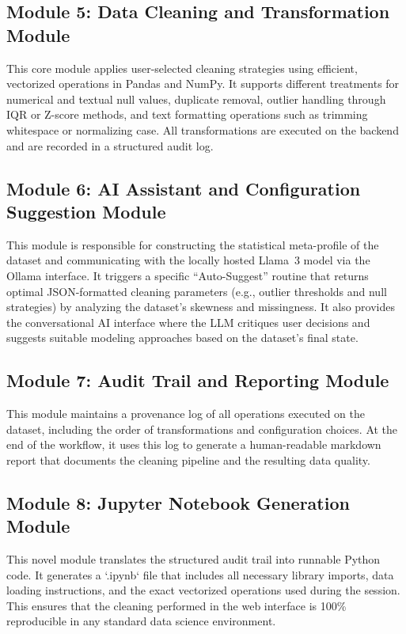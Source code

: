 \documentclass[conference]{IEEEtran}
\begin{document}
\subsection*{Module 5: Data Cleaning and Transformation Module}
This core module applies user-selected cleaning strategies using efficient, vectorized operations in Pandas and NumPy. It supports different treatments for numerical and textual null values, duplicate removal, outlier handling through IQR or Z-score methods, and text formatting operations such as trimming whitespace or normalizing case. All transformations are executed on the backend and are recorded in a structured audit log.

\subsection*{Module 6: AI Assistant and Configuration Suggestion Module}
This module is responsible for constructing the statistical meta-profile of the dataset and communicating with the locally hosted Llama~3 model via the Ollama interface. It triggers a specific ``Auto-Suggest'' routine that returns optimal JSON-formatted cleaning parameters (e.g., outlier thresholds and null strategies) by analyzing the dataset's skewness and missingness. It also provides the conversational AI interface where the LLM critiques user decisions and suggests suitable modeling approaches based on the dataset's final state.

\subsection*{Module 7: Audit Trail and Reporting Module}
This module maintains a provenance log of all operations executed on the dataset, including the order of transformations and configuration choices. At the end of the workflow, it uses this log to generate a human-readable markdown report that documents the cleaning pipeline and the resulting data quality.

\subsection*{Module 8: Jupyter Notebook Generation Module}
This novel module translates the structured audit trail into runnable Python code. It generates a `.ipynb` file that includes all necessary library imports, data loading instructions, and the exact vectorized operations used during the session. This ensures that the cleaning performed in the web interface is 100\% reproducible in any standard data science environment.
\end{document}
